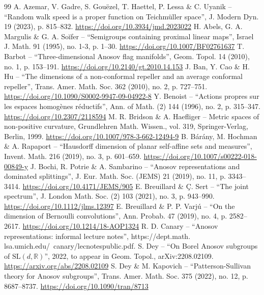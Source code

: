 \begin{thebibliography}{99}
 A. Azemar, V. Gadre, S. Gouëzel, T. Haettel, P. Lessa \& C. Uyanik – “Random walk speed is a proper function on Teichmüller space”, J. Modern Dyn. 19 (2023), p. 815–832. \url{https://doi.org/10.3934/jmd.2023022}
 H. Abels, G. A. Margulis \& G. A. Soĭfer – “Semigroups containing proximal linear maps”, Israel J. Math. 91 (1995), no. 1-3, p. 1–30. \url{https://doi.org/10.1007/BF02761637}
 T. Barbot – “Three-dimensional Anosov flag manifolds”, Geom. Topol. 14 (2010), no. 1, p. 153–191. \url{https://doi.org/10.2140/gt.2010.14.153}
 J. Ban, Y. Cao \& H. Hu – “The dimensions of a non-conformal repeller and an average conformal repeller”, Trans. Amer. Math. Soc. 362 (2010), no. 2, p. 727–751. \url{https://doi.org/10.1090/S0002-9947-09-04922-8}
 Y. Benoist – “Actions propres sur les espaces homogènes réductifs”, Ann. of Math. (2) 144 (1996), no. 2, p. 315–347. \url{https://doi.org/10.2307/2118594}
 M. R. Bridson \& A. Haefliger – Metric spaces of non-positive curvature, Grundlehren Math. Wissen., vol. 319, Springer-Verlag, Berlin, 1999. \url{https://doi.org/10.1007/978-3-662-12494-9}
 B. Bárány, M. Hochman \& A. Rapaport – “Hausdorff dimension of planar self-affine sets and measures”, Invent. Math. 216 (2019), no. 3, p. 601–659. \url{https://doi.org/10.1007/s00222-018-00849-y}
 J. Bochi, R. Potrie \& A. Sambarino – “Anosov representations and dominated splittings”, J. Eur. Math. Soc. (JEMS) 21 (2019), no. 11, p. 3343–3414. \url{https://doi.org/10.4171/JEMS/905}
 E. Breuillard \& Ç. Sert – “The joint spectrum”, J. London Math. Soc. (2) 103 (2021), no. 3, p. 943–990. \url{https://doi.org/10.1112/jlms.12397}
 E. Breuillard \& P. P. Varjú – “On the dimension of Bernoulli convolutions”, Ann. Probab. 47 (2019), no. 4, p. 2582–2617. \url{https://doi.org/10.1214/18-AOP1324}
 R. D. Canary – “Anosov representations: informal lecture notes”, https://dept.math. lsa.umich.edu/~canary/lecnotespublic.pdf. 
 S. Dey – “On Borel Anosov subgroups of $\mathrm{SL}(d, \mathbb{R})$”, 2022, to appear in Geom. Topol., arXiv:2208.02109. \url{https://arxiv.org/abs/2208.02109}
 S. Dey \& M. Kapovich – “Patterson-Sullivan theory for Anosov subgroups”, Trans. Amer. Math. Soc. 375 (2022), no. 12, p. 8687–8737. \url{https://doi.org/10.1090/tran/8713}

\end{thebibliography}

